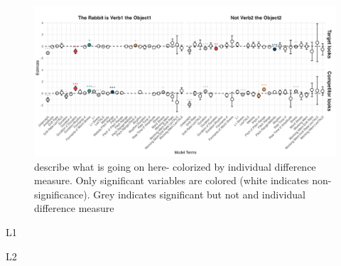 \begin{figure}[H]  %
    \centering
    \includegraphics[width=\textwidth,height=\textheight,keepaspectratio]{viz/id_gam_mod_out.png}
    \caption{describe what is going on here- colorized by individual difference measure. Only significant variables are colored (white indicates non-significance). Grey indicates significant but not and individual difference measure}
    \label{fig:id_gam_mod_out}
\end{figure}

L1 

L2


